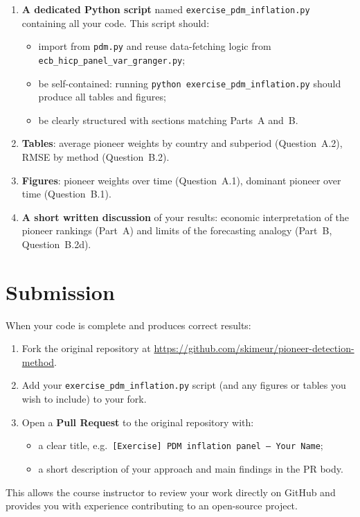 \documentclass[11pt,a4paper]{article}
\begin{document}
\begin{enumerate}[label=\arabic*.]
    \item \textbf{A dedicated Python script} named \texttt{exercise\_pdm\_inflation.py} containing all your code. This script should:
    \begin{itemize}[nosep]
        \item import from \texttt{pdm.py} and reuse data-fetching logic from \texttt{ecb\_hicp\_panel\_var\_granger.py};
        \item be self-contained: running \texttt{python exercise\_pdm\_inflation.py} should produce all tables and figures;
        \item be clearly structured with sections matching Parts~A and~B.
    \end{itemize}
    \item \textbf{Tables}: average pioneer weights by country and subperiod (Question~A.2), RMSE by method (Question~B.2).
    \item \textbf{Figures}: pioneer weights over time (Question~A.1), dominant pioneer over time (Question~B.1).
    \item \textbf{A short written discussion} of your results: economic interpretation of the pioneer rankings (Part~A) and limits of the forecasting analogy (Part~B, Question~B.2d).
\end{enumerate}

\section*{Submission}

When your code is complete and produces correct results:

\begin{enumerate}[label=\arabic*.]
    \item Fork the original repository at \url{https://github.com/skimeur/pioneer-detection-method}.
    \item Add your \texttt{exercise\_pdm\_inflation.py} script (and any figures or tables you wish to include) to your fork.
    \item Open a \textbf{Pull Request} to the original repository with:
    \begin{itemize}[nosep]
        \item a clear title, e.g.\ \texttt{[Exercise] PDM inflation panel -- Your Name};
        \item a short description of your approach and main findings in the PR body.
    \end{itemize}
\end{enumerate}

\noindent This allows the course instructor to review your work directly on GitHub and provides you with experience contributing to an open-source project.
\end{document}
